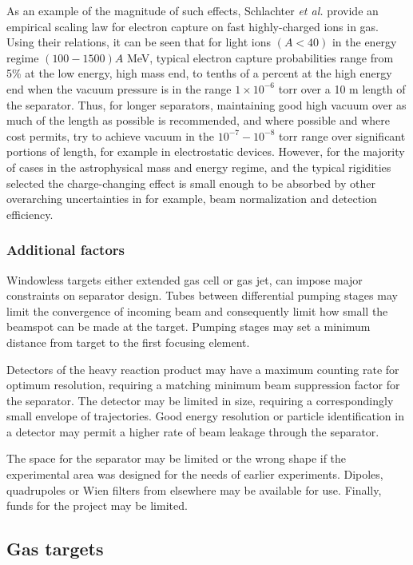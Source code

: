 As an example of the magnitude of such effects, Schlachter {\em et al.} \cite{sch83} provide an empirical scaling law for electron capture on fast highly-charged ions in gas. Using their relations, it can be seen that for light ions $(A<40)$ in the energy regime $(100-1500)A$ MeV, typical electron capture probabilities range from 5\% at the low energy, high mass end, to tenths of a percent at the high energy end when the vacuum pressure is in the range $1\times10^{-6}$ torr over a 10 m length of the separator. Thus, for longer separators, maintaining good high vacuum over as much of the length as possible is recommended, and where possible and where cost permits, try to achieve vacuum in the $10^{-7}-10^{-8}$ torr range over significant portions of length, for example in electrostatic devices. However, for the majority of cases in the astrophysical mass and energy regime, and the typical rigidities selected the charge-changing effect is small enough to be absorbed by other overarching uncertainties in for example, beam normalization and detection efficiency. 



\subsubsection{Additional factors} 
  Windowless targets either extended gas cell or gas jet, can impose major constraints on separator design.  Tubes between differential pumping stages may limit the convergence of incoming beam and consequently limit how small the beamspot  can be made at the target.  Pumping stages may set a minimum distance from target to the first focusing element.

Detectors of the heavy reaction product may have a maximum counting rate for optimum resolution, requiring a matching minimum beam suppression factor for the separator.   The detector may be limited in size, requiring a correspondingly small envelope of trajectories.    Good energy resolution or particle identification in a detector may permit a higher rate of beam leakage through the separator.

 The space   for the separator may be limited or the wrong shape if the experimental area was designed for the needs of earlier experiments.   Dipoles, quadrupoles  or Wien filters from elsewhere  may be available for use.  Finally,  funds for the project may be limited.   

\subsection{Gas targets}\label{gastarg}

